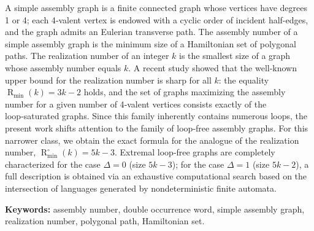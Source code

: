 \documentclass{article}
\theoremstyle{definition}
\newcommand{\An}{\operatorname{An}}
\newcommand{\D}{\Delta}
\newcommand{\Rmin}{\operatorname{R}_{\min}}
\newcommand{\Romin}{\operatorname{R}_{\min}^\circ}
\begin{document}
A simple assembly graph is a finite connected graph whose vertices have degrees 1 or 4; each 4‑valent vertex is endowed with a cyclic order of incident half-edges, and the graph admits an Eulerian transverse path.
The assembly number of a simple assembly graph is the minimum size of a Hamiltonian set of polygonal paths. 
The realization number of an integer \(k\) is the smallest size of a graph whose assembly number equals \(k\). 
A recent study showed that the well-known upper bound for the realization number is sharp for all \(k\): the equality \(\Rmin(k) = 3k-2\) holds, and the set of graphs maximizing the assembly number for a given number of 4‑valent vertices consists exactly of the loop‑saturated graphs. 
Since this family inherently contains numerous loops, the present work shifts attention to the family of loop‑free assembly graphs. For this narrower class, we obtain the exact formula for the analogue of the realization number, \(\Romin(k) = 5k-3\). 
Extremal loop‑free graphs are completely characterized for the case \(\D = 0\) (size \(5k-3\)); for the case \(\D = 1\) (size \(5k-2\)), a full description is obtained via an exhaustive computational search based on the intersection of languages generated by nondeterministic finite automata.

\medskip
\noindent\textbf{Keywords:} assembly number, double occurrence word, simple assembly graph, realization number, polygonal path, Hamiltonian set.

\newpage



\end{document}
